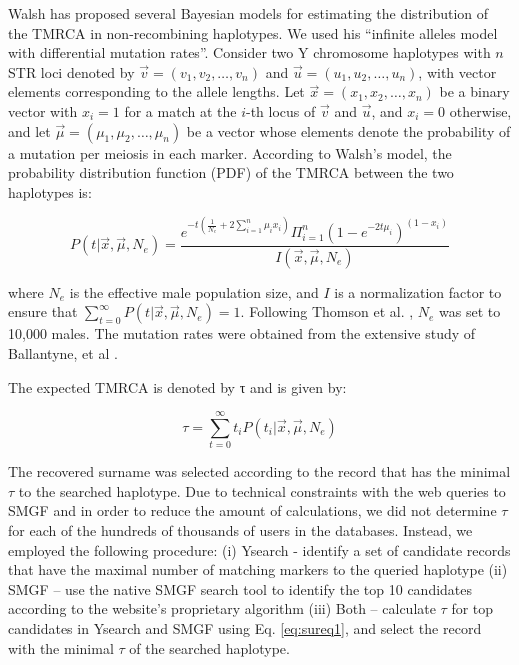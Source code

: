 Walsh \cite{Walsh2001} has proposed several Bayesian models for estimating the distribution of the TMRCA in non-recombining haplotypes. We used his ``infinite alleles model with differential mutation rates''. Consider two Y chromosome haplotypes with $n$ STR loci denoted by $\vec{v}=(v_1,v_2,\hdots,v_n)$ and $\vec{u}=(u_1,u_2,\hdots,u_n)$, with vector elements corresponding to the allele lengths. Let $\vec{x} = (x_1,x_2,\hdots,x_n)$ be a binary vector with $x_i=1$ for a match at the $i$-th locus of $\vec{v}$ and $\vec{u}$, and $x_i=0$ otherwise, and let $\vec{\mu}=(\mu_1,\mu_2,\hdots,\mu_n)$ be a vector whose elements denote the probability of a mutation per meiosis in each marker. According to Walsh's model, the probability distribution function (PDF) of the TMRCA between the two haplotypes is:

\begin{equation}
\label{eq:sureq1}
P(t|\vec{x},\vec{\mu}, N_e) = \frac{e^{-t(\frac{1}{N_e}+2\sum_{i=1}^n\mu_ix_i)}\Pi_{i=1}^n(1-e^{-2t\mu_i})^{(1-x_i)}}{I(\vec{x},\vec{\mu},N_e)}
\end{equation}

where $N_e$ is the effective male population size, and $I$ is a normalization factor to ensure that $\sum_{t=0}^{\infty}P(t|\vec{x},\vec{\mu},N_e)=1$. Following Thomson et al. \cite{ThomsonPritchardShenEtAl2000}, $N_e$ was set to 10,000 males. The mutation rates were obtained from the extensive study of Ballantyne, et al \cite{BallantyneGoedbloedFangEtAl2010}.

The expected TMRCA is denoted by τ and is given by:

\begin{equation}
\tau = \sum_{t=0}^{\infty}t_i P(t_i|\vec{x}, \vec{\mu}, N_e)
\end{equation}

The recovered surname was selected according to the record that has the minimal $\tau$ to the searched haplotype. Due to technical constraints with the web queries to SMGF and in order to reduce the amount of calculations, we did not determine $\tau$ for each of the hundreds of thousands of users in the databases. Instead, we employed the following procedure: (i) Ysearch - identify a set of candidate records that have the maximal number of matching markers to the queried haplotype (ii) SMGF – use the native SMGF search tool to identify the top 10 candidates according to the website's proprietary algorithm (iii) Both – calculate $\tau$ for top candidates in Ysearch and SMGF using Eq. \ref{eq:sureq1}, and select the record with the minimal $\tau$ of the searched haplotype. 

